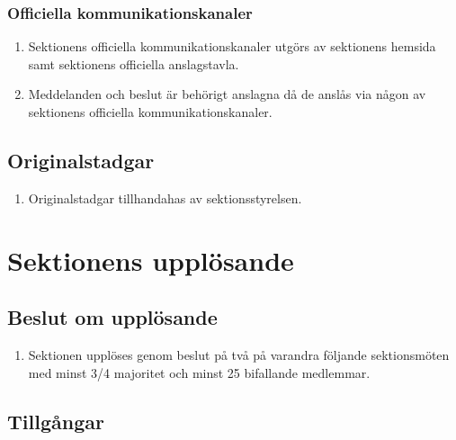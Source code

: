 \documentclass[11pt,a4paper]{article}
\begin{document}
\subsubsection{Officiella kommunikationskanaler}

\begin{enumerate}[\thesubsection .1]

  \item Sektionens officiella kommunikationskanaler utgörs av sektionens hemsida samt sektionens officiella
  anslagstavla.

  \item Meddelanden och beslut är behörigt anslagna då de anslås 
  via någon av sektionens officiella kommunikationskanaler.

\end{enumerate}


\subsection{Originalstadgar}

\begin{enumerate}[\thesubsection .1]

  \item Originalstadgar tillhandahas av sektionsstyrelsen.

\end{enumerate}


\section{Sektionens upplösande}

\subsection{Beslut om upplösande}

\begin{enumerate}[\thesubsection .1]

  \item Sektionen upplöses genom beslut på två på varandra följande
  sektionsmöten med minst 3/4 majoritet och minst 25 bifallande
  medlemmar.

\end{enumerate}

\subsection{Tillgångar}
\end{document}

